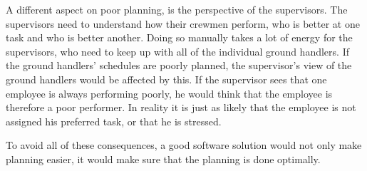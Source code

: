 A different aspect on poor planning, is the perspective of the supervisors. The supervisors need to understand how their crewmen perform, who is better at one task and who is better another. Doing so manually takes a lot of energy for the supervisors, who need to keep up with all of the individual ground handlers. If the ground handlers' schedules are poorly planned, the supervisor's view of the ground handlers would be affected by this. If the supervisor sees that one employee is always performing poorly, he would think that the employee is therefore a poor performer. In reality it is just as likely that the employee is not assigned his preferred task, or that he is stressed.


To avoid all of these consequences, a good software solution would not only make planning easier, it would make sure that the planning is done optimally.